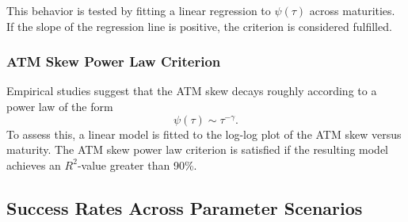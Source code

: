 This behavior is tested by fitting a linear regression to $\psi(\tau)$ across maturities. If the slope of the regression line is positive, the criterion is considered fulfilled.

\subsubsection*{ATM Skew Power Law Criterion}
Empirical studies suggest that the ATM skew decays roughly according to a power law of the form
\begin{equation} \label{eq:PowerLaw}
    \psi(\tau) \sim \tau^{-\gamma}.
\end{equation}
To assess this, a linear model is fitted to the log-log plot of the ATM skew versus maturity. The ATM skew power law criterion is satisfied if the resulting model achieves an $R^2$-value greater than 90\%.


\subsection{Success Rates Across Parameter Scenarios}







